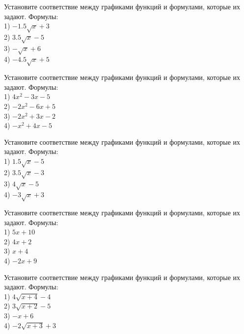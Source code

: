 \documentclass[4apaper]{article}
\begin{document}
\begin{taskBN}{94}
Установите соответствие между графиками функций и формулами, которые их задают. Формулы: \\1) $-1.5\sqrt{x}+3$\\2) $3.5\sqrt{x}-5$\\3) $-\sqrt{x}+6$\\4) $-4.5\sqrt{x}+5$
\end{taskBN}

\begin{taskBN}{95}
Установите соответствие между графиками функций и формулами, которые их задают. Формулы: \\1) $4x^2-3x-5$\\2) $-2x^2-6x+5$\\3) $-2x^2+3x-2$\\4) $-x^2+4x-5$
\end{taskBN}

\begin{taskBN}{96}
Установите соответствие между графиками функций и формулами, которые их задают. Формулы: \\1) $1.5\sqrt{x}-5$\\2) $3.5\sqrt{x}-3$\\3) $4\sqrt{x}-5$\\4) $-3\sqrt{x}+3$
\end{taskBN}

\begin{taskBN}{97}
Установите соответствие между графиками функций и формулами, которые их задают. Формулы: \\1) $5x+10$\\2) $4x+2$\\3) $x+4$\\4) $-2x+9$
\end{taskBN}

\begin{taskBN}{98}
Установите соответствие между графиками функций и формулами, которые их задают. Формулы: \\1) $4\sqrt{x+4}-4$\\2) $3\sqrt{x+2}-5$\\3) $-x+6$\\4) $-2\sqrt{x+3}+3$
\end{taskBN}
\end{document}

